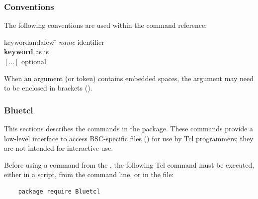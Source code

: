 

\subsubsection{Conventions}

The following conventions are used within the command reference:
\begin{tabbing}
keywordandafew     \=     \kill
{\em name} \> identifier \\
{\bf keyword} \> as is \\
$[...]$ \> optional \\
\end{tabbing}

When an argument (or token) contains embedded spaces, the argument may
need to be enclosed in brackets (\te{\{ \}}).



\subsubsection{Bluetcl}

This sections describes the commands in the  package.  These commands
provide a low-level interface to access BSC-specific files
() for use by Tcl programmers; they are not intended
for interactive use.  

Before using a command from the ,  the
following Tcl command must  be executed, either in a script, 
from the command line, or in the  file:
\begin{verbatim}
    package require Bluetcl
\end{verbatim}

